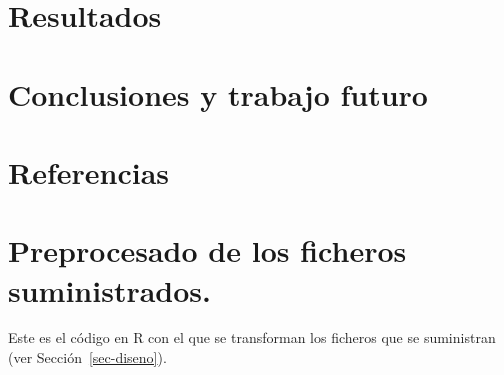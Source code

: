 \documentclass[
  12pt,
  a4paper,
  extrafontsizes,
  onecolumn,
  openright]{memoir}
\begin{document}
\normalsize


\hypertarget{resultados}{%
\chapter{Resultados}\label{resultados}}


\hypertarget{conclusiones}{%
\chapter{Conclusiones y trabajo futuro}\label{conclusiones}}


\hypertarget{referencias}{%
\chapter*{Referencias}\label{referencias}}


\printbibliography[heading=none]

\cleardoublepage
{}
{}
\appendix

\hypertarget{sec-preprocess}{%
\chapter{Preprocesado de los ficheros
suministrados.}\label{sec-preprocess}}

Este es el código en R con el que se transforman los ficheros que se
suministran (ver Sección~\ref{sec-diseno}).

\footnotesize
\end{document}
